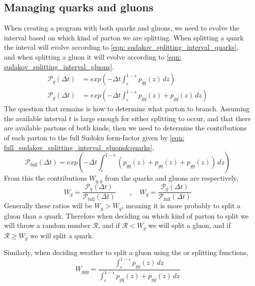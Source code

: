 \documentclass[main.tex]{subfiles}
\begin{document}
\subsection{Managing quarks and gluons}\label{sec: managing_quarks_and_gluons}
When creating a program with both quarks and gluons, we need to evolve the interval based on which kind of parton we are splitting. When splitting a quark the inteval will evolve according to \autoref{eqn: sudakov_splitting_interval_quarks}, and when splitting a gluon it will evolve according to \autoref{eqn: sudakov_splitting_interval_gluons}.
\begin{align}
    \mathcal{P}_{q}(\Delta t) &= exp\left(-\Delta t \int_\epsilon^{1-\epsilon} p_{qq}(z) \, dz \right) \label{eqn: sudakov_splitting_interval_quarks}\\
    \mathcal{P}_{g}(\Delta t) &= exp\left(-\Delta t \int_\epsilon^{1-\epsilon} p_{gq}(z) + p_{gg}(z) \, dz \right)  \label{eqn: sudakov_splitting_interval_gluons}  
\end{align}
The question that remains is how to determine what parton to branch. Assuming the available interval \(t\) is large enough for either splitting to occur, and that there are available partons of both kinds, then we need to determine the contributions of each parton to the full Sudoku form-factor given by \autoref{eqn: full_sudakov_splitting_interval_gluons&quarks},
\begin{equation}\label{eqn: full_sudakov_splitting_interval_gluons&quarks} 
    \mathcal{P}_{\text{full}}(\Delta t) = exp\left(-\Delta t \int_\epsilon^{1-\epsilon}( p_{qq}(z) + p_{gq}(z) + p_{gg}(z) )\, dz \right) 
\end{equation}
From this the contributions \(W_{q,g}\) from the quarks and gluons are respectively, 
\begin{equation}\label{eqn: parton_selection_ratios}
    W_q = \frac{\mathcal{P}_{q}(\Delta t)}{\mathcal{P}_{\text{full}}(\Delta t)} \qquad , \quad 
    W_g = \frac{\mathcal{P}_{g}(\Delta t)}{\mathcal{P}_{\text{full}}(\Delta t)}
\end{equation}
Generally these ratios will be \(W_g > W_q\), meaning it is more probably to split a gluon than a quark. Therefore when deciding on which kind of parton to split we will throw a random number \(\mathcal{R}\), and if \(\mathcal{R} < W_g\) we will split a gluon, and if \(\mathcal{R} \geq W_g\) we will split a quark.

Similarly, when deciding weather to split a gluon using the \ggg or \gqq splitting functions,
\begin{equation}\label{eqn: gluon_splitting_selection_ratios}
    W_{ggg} = \frac{\int_\epsilon^{1-\epsilon} p_{gg}(z) \, dz}{\int_\epsilon^{1-\epsilon}p_{gq}(z) + p_{gg}(z) \, dz}
\end{equation}
\end{document}
